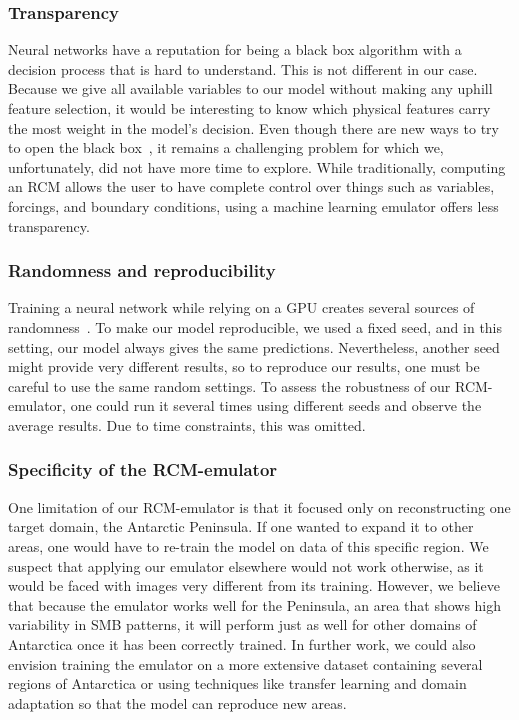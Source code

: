 \documentclass[a4paper,11pt,oneside]{report}
\begin{document}
\subsubsection{Transparency}
Neural networks have a reputation for being a black box algorithm with a decision process that is hard to understand. This is not different in our case. Because we give all available variables to our model without making any uphill feature selection, it would be interesting to know which physical features carry the most weight in the model's decision. Even though there are new ways to try to open the black box~\cite{Guidotti, Shwartz2017}, it remains a challenging problem for which we, unfortunately, did not have more time to explore. While traditionally, computing an RCM allows the user to have complete control over things such as variables, forcings, and boundary conditions, using a machine learning emulator offers less transparency.

\subsubsection{Randomness and reproducibility}
Training a neural network while relying on a GPU creates several sources of randomness~\cite{Zhuang2021, Reproducibility}. To make our model reproducible, we used a fixed seed, and in this setting, our model always gives the same predictions. Nevertheless, another seed might provide very different results, so to reproduce our results, one must be careful to use the same random settings. To assess the robustness of our RCM-emulator, one could run it several times using different seeds and observe the average results. Due to time constraints, this was omitted. 

\subsubsection{Specificity of the RCM-emulator}
One limitation of our RCM-emulator is that it focused only on reconstructing one target domain, the Antarctic Peninsula. If one wanted to expand it to other areas, one would have to re-train the model on data of this specific region. We suspect that applying our emulator elsewhere would not work otherwise, as it would be faced with images very different from its training. However, we believe that because the emulator works well for the Peninsula, an area that shows high variability in SMB patterns, it will perform just as well for other domains of Antarctica once it has been correctly trained. In further work, we could also envision training the emulator on a more extensive dataset containing several regions of Antarctica or using techniques like transfer learning and domain adaptation so that the model can reproduce new areas.  
\end{document}
